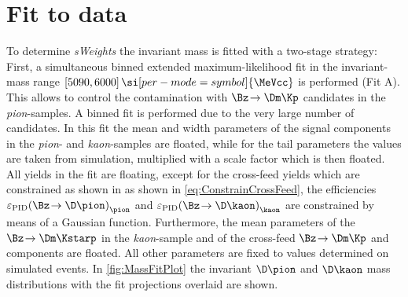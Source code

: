 \section{Fit to data}
\label{sec:MassFitData}

To determine \emph{sWeights} the invariant \Bz mass is fitted with a two-stage strategy:
First, a simultaneous binned extended maximum-likelihood fit in the invariant-mass range $[5090, 6000]\,\si[per-mode=symbol]{\MeVcc}$ is performed (Fit A).
This allows to control the contamination with $\Bz\!\to\Dm\Kp$ candidates in the \emph{pion}-samples.
A binned fit is performed due to the very large number of candidates.
In this fit the mean and width parameters of the signal components in the \emph{pion}- and \emph{kaon}-samples are floated, while for the tail parameters the values are taken from simulation, multiplied with a scale factor which is then floated.
All yields in the fit are floating, except for the cross-feed yields which are constrained as shown in as shown in \cref{eq:ConstrainCrossFeed}, \ie the efficiencies $\varepsilon_{\text{PID}}\!\left(\Bz\!\to\D \pion\right)_{\pion}$ and $\varepsilon_{\text{PID}}\!\left(\Bz\!\to\D \kaon\right)_{\kaon}$ are constrained by means of a Gaussian function.
Furthermore, the mean parameters of the $\Bz\!\to\Dm\Kstarp$ in the \emph{kaon}-sample and of the cross-feed $\Bz\!\to\Dm\Kp$ and \BdToDpi components are floated.
All other parameters are fixed to values determined on simulated events.
In \cref{fig:MassFitPlot} the invariant $\D\pion$  and $\D\kaon$ mass distributions with the fit projections overlaid are shown.
